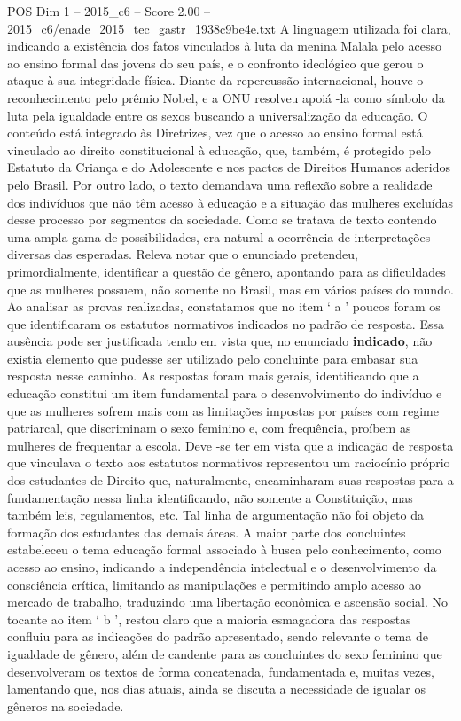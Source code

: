 \begin{textsample}{POS Dim 1 – 2015\_c6 – Score 2.00 – 2015\_c6/enade\_2015\_tec\_gastr\_1938c9be4e.txt}
A linguagem utilizada foi clara, indicando a existência dos fatos vinculados à luta da menina Malala pelo acesso ao ensino formal das jovens do seu país, e o confronto ideológico que gerou o ataque à sua integridade física.
Diante da repercussão internacional, houve o reconhecimento pelo prêmio Nobel, e a ONU resolveu apoiá -la como símbolo da luta pela igualdade entre os sexos buscando a universalização da educação.
O conteúdo está integrado às Diretrizes, vez que o acesso ao ensino formal está vinculado ao direito constitucional à educação, que, também, é protegido pelo Estatuto da Criança e do Adolescente e nos pactos de Direitos Humanos aderidos pelo Brasil.
Por outro lado, o texto demandava uma reflexão sobre a realidade dos indivíduos que não têm acesso à educação e a situação das mulheres excluídas desse processo por segmentos da sociedade.
Como se tratava de texto contendo uma ampla gama de possibilidades, era natural a ocorrência de interpretações diversas das esperadas.
Releva notar que o enunciado pretendeu, primordialmente, identificar a questão de gênero, apontando para as dificuldades que as mulheres possuem, não somente no Brasil, mas em vários países do mundo.
Ao analisar as provas realizadas, constatamos que no item ‘ a ’ poucos foram os que identificaram os estatutos normativos indicados no padrão de resposta.
Essa ausência pode ser justificada tendo em vista que, no enunciado \textbf{indicado}, não existia elemento que pudesse ser utilizado pelo concluinte para embasar sua resposta nesse caminho.
As respostas foram mais gerais, identificando que a educação constitui um item fundamental para o desenvolvimento do indivíduo e que as mulheres sofrem mais com as limitações impostas por países com regime patriarcal, que discriminam o sexo feminino e, com frequência, proíbem as mulheres de frequentar a escola.
Deve -se ter em vista que a indicação de resposta que vinculava o texto aos estatutos normativos representou um raciocínio próprio dos estudantes de Direito que, naturalmente, encaminharam suas respostas para a fundamentação nessa linha identificando, não somente a Constituição, mas também leis, regulamentos, etc.
Tal linha de argumentação não foi objeto da formação dos estudantes das demais áreas.
A maior parte dos concluintes estabeleceu o tema educação formal associado à busca pelo conhecimento, como acesso ao ensino, indicando a independência intelectual e o desenvolvimento da consciência crítica, limitando as manipulações e permitindo amplo acesso ao mercado de trabalho, traduzindo uma libertação econômica e ascensão social.
No tocante ao item ‘ b ’, restou claro que a maioria esmagadora das respostas confluiu para as indicações do padrão apresentado, sendo relevante o tema de igualdade de gênero, além de candente para as concluintes do sexo feminino que desenvolveram os textos de forma concatenada, fundamentada e, muitas vezes, lamentando que, nos dias atuais, ainda se discuta a necessidade de igualar os gêneros na sociedade.

\end{textsample}

